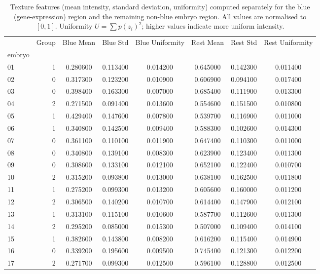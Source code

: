 \begin{table}
\caption{Texture features (mean intensity, standard deviation, uniformity) computed separately for the blue (gene-expression) region and the remaining non-blue embryo region. All values are normalised to $[0,1]$. Uniformity $U = \sum p(z_i)^2$; higher values indicate more uniform intensity.}
\label{tab:texture}
\begin{tabular}{l|r|ccc|ccc}
\toprule
 & Group & Blue Mean & Blue Std & Blue Uniformity & Rest Mean & Rest Std & Rest Uniformity \\
embryo &  &  &  &  &  &  &  \\
\midrule
01 & 1 & 0.280600 & 0.113400 & 0.014200 & 0.645000 & 0.142300 & 0.011400 \\
02 & 0 & 0.317300 & 0.123200 & 0.010900 & 0.606900 & 0.094100 & 0.017400 \\
03 & 0 & 0.398400 & 0.163300 & 0.007000 & 0.685400 & 0.111900 & 0.013300 \\
04 & 2 & 0.271500 & 0.091400 & 0.013600 & 0.554600 & 0.151500 & 0.010800 \\
05 & 1 & 0.429400 & 0.147600 & 0.007800 & 0.539700 & 0.116900 & 0.011000 \\
06 & 1 & 0.340800 & 0.142500 & 0.009400 & 0.588300 & 0.102600 & 0.014300 \\
07 & 0 & 0.361100 & 0.110100 & 0.011900 & 0.647400 & 0.110300 & 0.011000 \\
08 & 0 & 0.340800 & 0.139100 & 0.008300 & 0.623900 & 0.123400 & 0.011300 \\
09 & 0 & 0.308600 & 0.133100 & 0.012100 & 0.652100 & 0.122400 & 0.010700 \\
10 & 2 & 0.315200 & 0.093800 & 0.013000 & 0.638100 & 0.162500 & 0.011800 \\
11 & 1 & 0.275200 & 0.099300 & 0.013200 & 0.605600 & 0.160000 & 0.011200 \\
12 & 2 & 0.306500 & 0.140200 & 0.010700 & 0.614400 & 0.147900 & 0.012100 \\
13 & 1 & 0.313100 & 0.115100 & 0.010600 & 0.587700 & 0.112600 & 0.011300 \\
14 & 2 & 0.295200 & 0.085000 & 0.015300 & 0.507000 & 0.109400 & 0.014100 \\
15 & 1 & 0.382600 & 0.143800 & 0.008200 & 0.616200 & 0.115400 & 0.014900 \\
16 & 0 & 0.339200 & 0.195600 & 0.009500 & 0.745400 & 0.121300 & 0.012200 \\
17 & 2 & 0.271700 & 0.099300 & 0.012500 & 0.596100 & 0.128800 & 0.012500 \\

\end{tabular}
\end{table}
